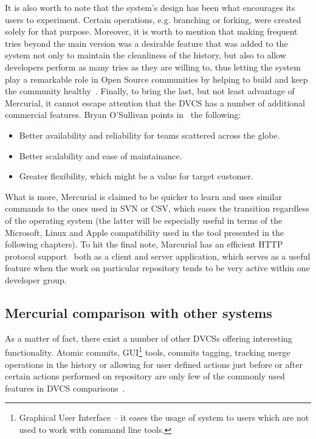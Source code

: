 It is also worth to note that the system's design has been what encourages its users to experiment. Certain operations, e.g. branching or forking, were created solely for that purpose. Moreover, it is worth to mention that making frequent tries beyond the main version was a desirable feature that was added to the system not only to maintain the cleanliness of the history, but also to allow developers perform as many tries as they are willing to, thus letting the system play a remarkable role in Open Source communities by helping to build and keep the community healthy~\cite{git_talk,svn_talk}. Finally, to bring the last, but not least advantage of Mercurial, it cannot escape attention that the DVCS has a number of additional commercial features. Bryan O'Sullivan points in~\cite[page 6]{hg_book} the following: 
\begin{itemize}
\item{Better availability and reliability for teams scattered across the globe.}
\item{Better scalability and ease of maintainance.}
\item{Greater flexibility, which might be a value for target customer.}
\end{itemize}
What is more, Mercurial is claimed to be quicker to learn and uses similar commands to the ones used in SVN or CSV, which eases the transition regardless of the operating system (the latter will be especially useful in terms of the Microsoft, Linux and Apple compatibility used in the tool presented in the following chapters). To hit the final note, Marcurial has an efficient HTTP protocol support~\cite{google_hg_git_compare} both as a client and server application, which serves as a useful feature when the work on particular repository tends to be very active within one developer group.

\subsection{Mercurial comparison with other systems}\label{subsec:dvcs_compare}
As a matter of fact, there exist a number of other DVCSs offering interesting functionality. Atomic commits, GUI\footnote{Graphical User Interface -- it eases the usage of system to users which are not used to work with command line tools.} tools, commits tagging, tracking merge operations in the history or allowing for user defined actions just before or after certain actions performed on repository are only few of the commonly used features in DVCS comparisons~\cite{wiki_dvcs_compare}. 


